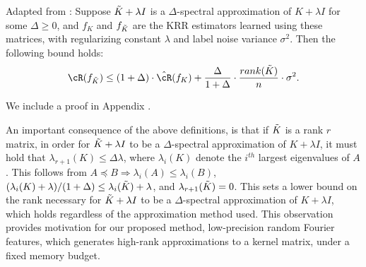 \begin{proposition}{Adapted from \citep{avron17}:}
Suppose $\tilde{K}+\lambda I$ is a $\Delta$-spectral approximation of $K+\lambda I$ for some $\Delta \geq 0$, and $f_{K}$ and $f_{\tilde{K}}$ are the KRR estimators learned using these matrices, with regularizing constant $\lambda$ and label noise variance $\sigma^2$.  Then the following bound holds:
\begin{eqnarray}
\cR(f_{\tK}) \leq (1+\Delta)\cdot \hcR(f_K) + \frac{\Delta}{1+\Delta}\cdot \frac{rank(\tK)}{n}\cdot\sigma^2.
\end{eqnarray}
\end{proposition}
We include a proof in Appendix .

An important consequence of the above definitions, is that if $\tilde{K}$ is a rank $r$ matrix, in order for $\tilde{K}+\lambda I$ to be a $\Delta$-spectral approximation of $K+\lambda I$, it must hold that $\lambda_{r+1}(K) \leq \Delta \lambda$, where $\lambda_i(K)$ denote the $i^{th}$ largest eigenvalues of $A$.  This follows from $A\preceq B \Rightarrow \lambda_i(A) \leq \lambda_i(B)$, $(\lambda_i(K) + \lambda)/(1+\Delta) \leq \lambda_i(\tilde{K}) + \lambda$, and $\lambda_{r+1}(\tilde{K}) = 0$.  This sets a lower bound on the rank necessary for $\tilde{K}+\lambda I$ to be a $\Delta$-spectral approximation of $K+\lambda I$, which holds regardless of the approximation method used.  This observation provides motivation for our proposed method, low-precision random Fourier features, which generates high-rank approximations to a kernel matrix, under a fixed memory budget.

